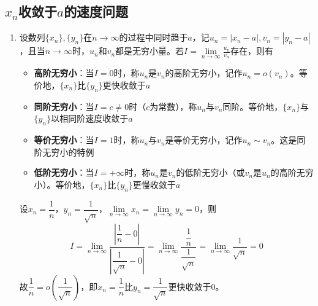 \documentclass[../book.tex]{subfiles}
\begin{document}
    \subsection{${x_n}$收敛于$a$的速度问题}

    \begin{enumerate}
        \item 设数列$\{x_n\}, \{y_n\}$在$n\to \infty$的过程中同时趋于$a$，记$u_n = |x_n - a|, v_n = |y_n - a|$，且当$n\to \infty$时，$u_n$和$v_n$都是无穷小量。若$I = \lim\limits_{n\to\infty} \displaystyle\frac{u_n}{v_n}$存在，则有

        \begin{itemize}
            \item \textbf{高阶无穷小}：当$I = 0$时，称$u_n$是$v_n$的高阶无穷小，记作$u_n = o(v_n)$。等价地，$\{x_n\}$比$\{y_n\}$更快收敛于$a$
            \item \textbf{同阶无穷小}：当$I = c \neq 0$时（$c$为常数），称$u_n$与$v_n$同阶。等价地，$\{x_n\}$与$\{y_n\}$以相同阶速度收敛于$a$
            \item \textbf{等价无穷小}：当$I = 1$时，称$u_n$与$v_n$是等价无穷小，记作$u_n \sim v_n$。这是同阶无穷小的特例
            \item \textbf{低阶无穷小}：当$I = +\infty$时，称$u_n$是$v_n$的低阶无穷小（或$v_n$是$u_n$的高阶无穷小）。等价地，$\{x_n\}$比$\{y_n\}$更慢收敛于$a$
        \end{itemize}

        \begin{analysisbox}[示例]
            设$x_n = \dfrac{1}{n}$，$y_n = \dfrac{1}{\sqrt{n}}$，$\lim\limits_{n\to \infty} x_n = \lim\limits_{n\to \infty} y_n = 0$，则
            \[
                I = \lim\limits_{n\to\infty} \dfrac{\left|\dfrac{1}{n} - 0\right|}{\left|\dfrac{1}{\sqrt{n}} - 0\right|}
                = \lim\limits_{n\to\infty} \dfrac{\dfrac{1}{n}}{\dfrac{1}{\sqrt{n}}}
                = \lim\limits_{n\to\infty} \dfrac{1}{\sqrt{n}}
                = 0
            \]
            故$\dfrac{1}{n} = o\!\left(\dfrac{1}{\sqrt{n}}\right)$，即$x_n = \dfrac{1}{n}$比$y_n = \dfrac{1}{\sqrt{n}}$更快收敛于$0$。
        \end{analysisbox}


\end{enumerate}
\end{document}
